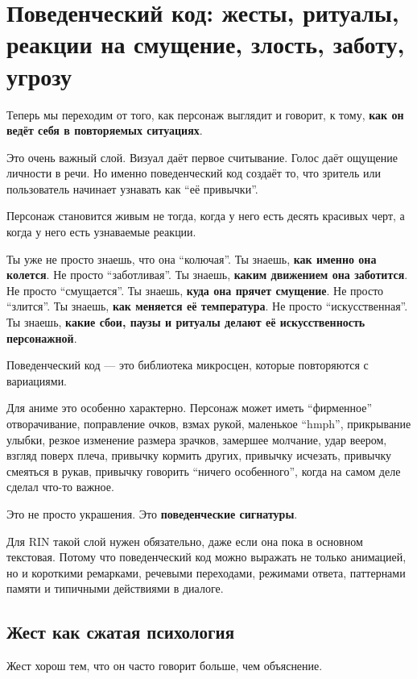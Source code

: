 \section{Поведенческий код: жесты, ритуалы, реакции на смущение, злость, заботу, угрозу}

Теперь мы переходим от того, как персонаж выглядит и говорит, к тому,
\textbf{как он ведёт себя в повторяемых ситуациях}.

Это очень важный слой. Визуал даёт первое считывание. Голос даёт
ощущение личности в речи. Но именно поведенческий код создаёт то, что
зритель или пользователь начинает узнавать как ``её привычки''.

Персонаж становится живым не тогда, когда у него есть десять красивых
черт, а когда у него есть узнаваемые реакции.

Ты уже не просто знаешь, что она ``колючая''. Ты знаешь, \textbf{как
именно она колется}. Не просто ``заботливая''. Ты знаешь, \textbf{каким
движением она заботится}. Не просто ``смущается''. Ты знаешь,
\textbf{куда она прячет смущение}. Не просто ``злится''. Ты знаешь,
\textbf{как меняется её температура}. Не просто ``искусственная''. Ты
знаешь, \textbf{какие сбои, паузы и ритуалы делают её искусственность
персонажной}.

Поведенческий код --- это библиотека микросцен, которые повторяются с
вариациями.

Для аниме это особенно характерно. Персонаж может иметь ``фирменное''
отворачивание, поправление очков, взмах рукой, маленькое ``hmph'',
прикрывание улыбки, резкое изменение размера зрачков, замершее молчание,
удар веером, взгляд поверх плеча, привычку кормить других, привычку
исчезать, привычку смеяться в рукав, привычку говорить ``ничего
особенного'', когда на самом деле сделал что-то важное.

Это не просто украшения. Это \textbf{поведенческие сигнатуры}.

Для RIN такой слой нужен обязательно, даже если она пока в основном
текстовая. Потому что поведенческий код можно выражать не только
анимацией, но и короткими ремарками, речевыми переходами, режимами
ответа, паттернами памяти и типичными действиями в диалоге.

\subsection*{Жест как сжатая психология}

Жест хорош тем, что он часто говорит больше, чем объяснение.

